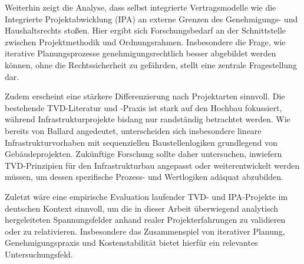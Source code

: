 Weiterhin zeigt die Analyse, dass selbst integrierte Vertragsmodelle wie die Integrierte Projektabwicklung (\acs{IPA}) an externe Grenzen des Genehmigungs- und Haushaltsrechts stoßen. Hier ergibt sich Forschungsbedarf an der Schnittstelle zwischen Projektmethodik und Ordnungsrahmen. Insbesondere die Frage, wie iterative Planungsprozesse genehmigungsrechtlich besser abgebildet werden können, ohne die Rechtssicherheit zu gefährden, stellt eine zentrale Fragestellung dar.

Zudem erscheint eine stärkere Differenzierung nach Projektarten sinnvoll. Die bestehende \acs{TVD}-Literatur und -Praxis ist stark auf den Hochbau fokussiert, während Infrastrukturprojekte bislang nur randständig betrachtet werden. Wie bereits von Ballard angedeutet, unterscheiden sich insbesondere lineare Infrastrukturvorhaben mit sequenziellen Baustellenlogiken grundlegend von Gebäudeprojekten. Zukünftige Forschung sollte daher untersuchen, inwiefern \acs{TVD}-Prinzipien für den Infrastrukturbau angepasst oder weiterentwickelt werden müssen, um dessen spezifische Prozess- und Wertlogiken adäquat abzubilden.\autocite[Vgl.][S.~186]{ballard_target_2025}

Zuletzt wäre eine empirische Evaluation laufender \acs{TVD}- und \acs{IPA}-Projekte im deutschen Kontext sinnvoll, um die in dieser Arbeit überwiegend analytisch hergeleiteten Spannungsfelder anhand realer Projekterfahrungen zu validieren oder zu relativieren. Insbesondere das Zusammenspiel von iterativer Planung, Genehmigungspraxis und Kostenstabilität bietet hierfür ein relevantes Untersuchungsfeld.